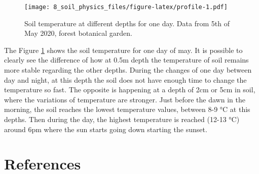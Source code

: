 \documentclass[
]{article}
\newenvironment{Shaded}{\begin{snugshade}}{\end{snugshade}}
\newcommand{\AttributeTok}[1]{\textcolor[rgb]{0.77,0.63,0.00}{#1}}
\newcommand{\CommentTok}[1]{\textcolor[rgb]{0.56,0.35,0.01}{\textit{#1}}}
\newcommand{\DecValTok}[1]{\textcolor[rgb]{0.00,0.00,0.81}{#1}}
\newcommand{\FunctionTok}[1]{\textcolor[rgb]{0.00,0.00,0.00}{#1}}
\newcommand{\NormalTok}[1]{#1}
\newcommand{\SpecialCharTok}[1]{\textcolor[rgb]{0.00,0.00,0.00}{#1}}
\newcommand{\StringTok}[1]{\textcolor[rgb]{0.31,0.60,0.02}{#1}}
\begin{document}
\begin{Shaded}
\end{Shaded}

\begin{figure}
\centering
\texttt{[image: 8\_soil\_physics\_files/figure-latex/profile-1.pdf]}
\caption{\label{fig:profile}Soil temperature at different depths for one day. Data from 5th of May 2020, forest botanical garden.}
\end{figure}

The Figure \ref{fig:profile} shows the soil temperature for one day of may. It is possible to clearly see the difference of how at 0.5m depth the temperature of soil remains more stable regarding the other depths. During the changes of one day between day and night, at this depth the soil does not have enough time to change the temperature so fast.
The opposite is happening at a depth of 2cm or 5cm in soil, where the variations of temperature are stronger.
Just before the dawn in the morning, the soil reaches the lowest temperature values, between 8-9 °C at this depths.
Then during the day, the highest temperature is reached (12-13 °C) around 6pm where the sun starts going down starting the sunset.

\newpage

\hypertarget{references}{%
\section*{References}\label{references}}
\end{document}
